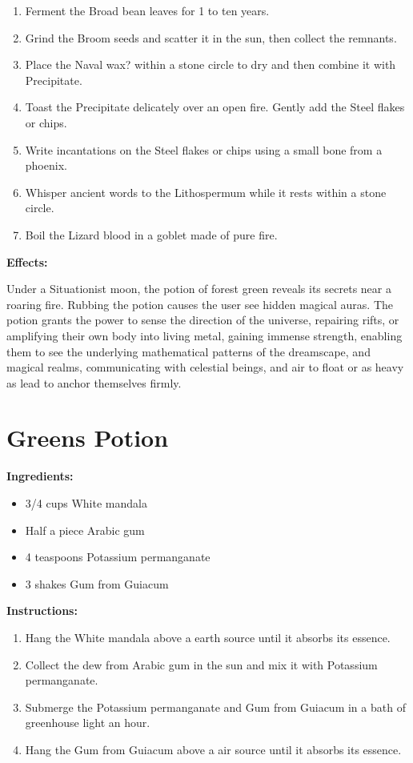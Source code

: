 \documentclass{article}
\begin{document}
\begin{enumerate}
  \item Ferment the Broad bean leaves for 1 to ten years.
  \item Grind the Broom seeds and scatter it in the sun, then collect the remnants.
  \item Place the Naval wax? within a stone circle to dry and then combine it with Precipitate.
  \item Toast the Precipitate delicately over an open fire. Gently add the Steel flakes or chips.
  \item Write incantations on the Steel flakes or chips using a small bone from a phoenix.
  \item Whisper ancient words to the Lithospermum while it rests within a stone circle.
  \item Boil the Lizard blood in a goblet made of pure fire.
\end{enumerate}

\textbf{Effects:}

Under a Situationist moon, the potion of forest green reveals its secrets near a roaring fire. Rubbing the potion causes the user see hidden magical auras. The potion grants the power to sense the direction of the universe, repairing rifts, or amplifying their own body into living metal, gaining immense strength, enabling them to see the underlying mathematical patterns of the dreamscape, and magical realms, communicating with celestial beings, and air to float or as heavy as lead to anchor themselves firmly.

\newpage
\section*{Greens Potion}

\textbf{Ingredients:}

\begin{itemize}
  \item 3/4 cups White mandala
  \item Half a piece Arabic gum
  \item 4 teaspoons Potassium permanganate
  \item 3 shakes Gum from Guiacum
\end{itemize}

\textbf{Instructions:}

\begin{enumerate}
  \item Hang the White mandala above a earth source until it absorbs its essence.
  \item Collect the dew from Arabic gum in the sun and mix it with Potassium permanganate.
  \item Submerge the Potassium permanganate and Gum from Guiacum in a bath of greenhouse light an hour.
  \item Hang the Gum from Guiacum above a air source until it absorbs its essence.
\end{enumerate}
\end{document}
